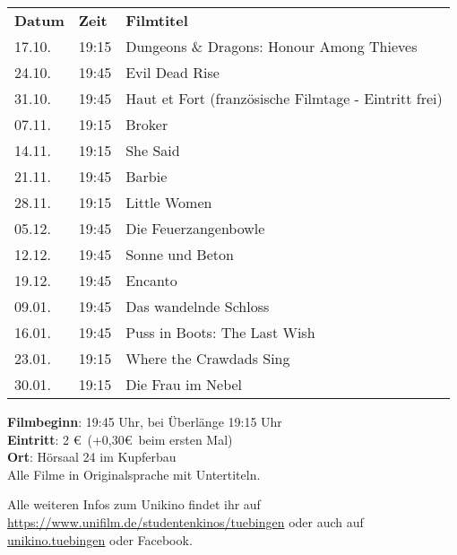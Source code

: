 \begin{tabular}{ll l}
\textbf{Datum} & \textbf{Zeit} & \textbf{Filmtitel} \\
17.10. & 19:15 & Dungeons \& Dragons: Honour Among Thieves \\
24.10. & 19:45 & Evil Dead Rise \\
31.10. & 19:45 & Haut et Fort (französische Filmtage - Eintritt frei) \\
07.11. & 19:15 & Broker \\
14.11. & 19:15 & She Said \\
21.11. & 19:45 & Barbie \\
28.11. & 19:15 & Little Women \\
05.12. & 19:45 & Die Feuerzangenbowle \\
12.12. & 19:45 & Sonne und Beton \\
19.12. & 19:45 & Encanto \\
09.01. & 19:45 & Das wandelnde Schloss \\
16.01. & 19:45 & Puss in Boots: The Last Wish \\
23.01. & 19:15 & Where the Crawdads Sing \\
30.01. & 19:15 & Die Frau im Nebel \\
\end{tabular}

\textbf{Filmbeginn}: 19:45 Uhr, bei Überlänge 19:15 Uhr\\
\textbf{Eintritt}: 2 \euro ~(+0,30\euro \ beim ersten Mal)\\
\textbf{Ort}: Hörsaal 24 im Kupferbau\\
Alle Filme in Originalsprache mit Untertiteln.

Alle weiteren Infos zum Unikino findet ihr auf
\url{https://www.unifilm.de/studentenkinos/tuebingen} oder auch auf
\href{https://www.instagram.com/Unikino.Tuebingen}{unikino.tuebingen}
oder Facebook.
